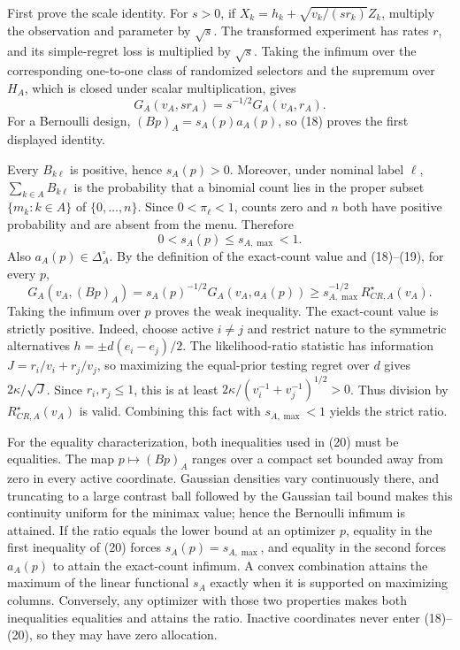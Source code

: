 First prove the scale identity.  For \(s>0\), if \(X_k=h_k+\sqrt{v_k/(sr_k)}Z_k\), multiply the observation and parameter by \(\sqrt s\).  The transformed experiment has rates \(r\), and its simple-regret loss is multiplied by \(\sqrt s\).  Taking the infimum over the corresponding one-to-one class of randomized selectors and the supremum over \(H_A\), which is closed under scalar multiplication, gives
\[
 G_A(v_A,sr_A)=s^{-1/2}G_A(v_A,r_A). \tag{18}
\]
For a Bernoulli design, \((Bp)_A=s_A(p)a_A(p)\), so (18) proves the first displayed identity.

Every \(B_{k\ell}\) is positive, hence \(s_A(p)>0\).  Moreover, under nominal label \(\ell\), \(\sum_{k\in A}B_{k\ell}\) is the probability that a binomial count lies in the proper subset \(\{m_k:k\in A\}\) of \(\{0,\ldots,n\}\).  Since \(0<\pi_\ell<1\), counts zero and \(n\) both have positive probability and are absent from the menu.  Therefore
\[
 0<s_A(p)\leq s_{A,\max}<1. \tag{19}
\]
Also \(a_A(p)\in\Delta_A^\circ\).  By the definition of the exact-count value and (18)--(19), for every \(p\),
\[
 G_A(v_A,(Bp)_A)
 =s_A(p)^{-1/2}G_A(v_A,a_A(p))
 \geq s_{A,\max}^{-1/2}R_{CR,A}^\star(v_A). \tag{20}
\]
Taking the infimum over \(p\) proves the weak inequality.  The exact-count value is strictly positive.  Indeed, choose active \(i\ne j\) and restrict nature to the symmetric alternatives \(h=\pm d(e_i-e_j)/2\).  The likelihood-ratio statistic has information \(J=r_i/v_i+r_j/v_j\), so maximizing the equal-prior testing regret over \(d\) gives \(2\kappa/\sqrt J\).  Since \(r_i,r_j\leq1\), this is at least \(2\kappa/(v_i^{-1}+v_j^{-1})^{1/2}>0\).  Thus division by \(R_{CR,A}^\star(v_A)\) is valid.  Combining this fact with \(s_{A,\max}<1\) yields the strict ratio.

For the equality characterization, both inequalities used in (20) must be equalities.  The map \(p\mapsto(Bp)_A\) ranges over a compact set bounded away from zero in every active coordinate.  Gaussian densities vary continuously there, and truncating to a large contrast ball followed by the Gaussian tail bound makes this continuity uniform for the minimax value; hence the Bernoulli infimum is attained.  If the ratio equals the lower bound at an optimizer \(p\), equality in the first inequality of (20) forces \(s_A(p)=s_{A,\max}\), and equality in the second forces \(a_A(p)\) to attain the exact-count infimum.  A convex combination attains the maximum of the linear functional \(s_A\) exactly when it is supported on maximizing columns.  Conversely, any optimizer with those two properties makes both inequalities equalities and attains the ratio.  Inactive coordinates never enter (18)--(20), so they may have zero allocation.